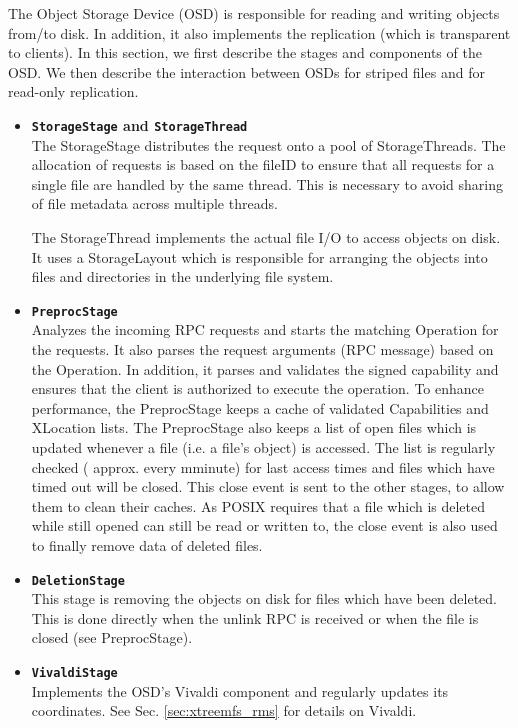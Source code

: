 The Object Storage Device (OSD) is responsible for reading and writing objects from/to disk. In addition, it also implements the replication (which is transparent to clients). In this section, we first describe the stages and components of the OSD. We then describe the interaction between OSDs for striped files and for read-only replication.

\begin{itemize}
 \item \textbf{\texttt{StorageStage} and \texttt{StorageThread}}\\
 The StorageStage distributes the request onto a pool of StorageThreads. The allocation of requests is based on the fileID to ensure that all requests for a single file are handled by the same thread. This is necessary to avoid sharing of file metadata across multiple threads.

The StorageThread implements the actual file I/O to access objects on disk. It uses a StorageLayout which is responsible for arranging the objects into files and directories in the underlying file system.

 \item \textbf{\texttt{PreprocStage}}\\
Analyzes the incoming RPC requests and starts the matching Operation for the requests. It also parses the request arguments (RPC message) based on the Operation. In addition, it parses and validates the signed capability and ensures that the client is authorized to execute the operation. To enhance performance, the PreprocStage keeps a cache of validated Capabilities and XLocation lists.
The PreprocStage also keeps a list of open files which is updated whenever a file (i.e. a file's object) is accessed. The list is regularly checked ( approx. every mminute) for last access times and files which have timed out will be closed. This close event is sent to the other stages, to allow them to clean their caches. As POSIX requires that a file which is deleted while still opened can still be read or written to, the close event is also used to finally remove data of deleted files.

 \item \textbf{\texttt{DeletionStage}}\\
This stage is removing the objects on disk for files which have been deleted. This is done directly when the unlink RPC is received or when the file is closed (see PreprocStage).

 \item \textbf{\texttt{VivaldiStage}}\\
Implements the OSD's Vivaldi component and regularly updates its coordinates. See Sec. \ref{sec:xtreemfs_rms} for details on Vivaldi.


\end{itemize}
